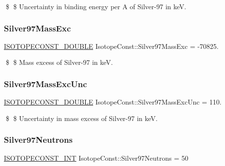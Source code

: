 \$ \$ Uncertainty in binding energy per A of Silver-\/97 in keV. \mbox{\label{group___isotope_const-_silver-_ag97_ga6b5e5a5da33a8427dd6a5a8e93cabce6}} 
\subsubsection{\texorpdfstring{Silver97\+Mass\+Exc}{Silver97MassExc}}
{\footnotesize\ttfamily \mbox{\hyperlink{group___isotope_const-_macros_ga8f45a7272ce02c0b4c65c44636ed719a}{I\+S\+O\+T\+O\+P\+E\+C\+O\+N\+S\+T\+\_\+\+D\+O\+U\+B\+LE}} Isotope\+Const\+::\+Silver97\+Mass\+Exc = -\/70825.}

\$ \$ Mass excess of Silver-\/97 in keV. \mbox{\label{group___isotope_const-_silver-_ag97_ga0194a969f2e0c95671b9bf14a9b91b2d}} 
\subsubsection{\texorpdfstring{Silver97\+Mass\+Exc\+Unc}{Silver97MassExcUnc}}
{\footnotesize\ttfamily \mbox{\hyperlink{group___isotope_const-_macros_ga8f45a7272ce02c0b4c65c44636ed719a}{I\+S\+O\+T\+O\+P\+E\+C\+O\+N\+S\+T\+\_\+\+D\+O\+U\+B\+LE}} Isotope\+Const\+::\+Silver97\+Mass\+Exc\+Unc = 110.}

\$ \$ Uncertainty in mass excess of Silver-\/97 in keV. \mbox{\label{group___isotope_const-_silver-_ag97_ga6397f81baf4168285225cc718ce626a8}} 
\subsubsection{\texorpdfstring{Silver97\+Neutrons}{Silver97Neutrons}}
{\footnotesize\ttfamily \mbox{\hyperlink{group___isotope_const-_macros_ga5f18360b3e99483a35c32d789e62621c}{I\+S\+O\+T\+O\+P\+E\+C\+O\+N\+S\+T\+\_\+\+I\+NT}} Isotope\+Const\+::\+Silver97\+Neutrons = 50}

